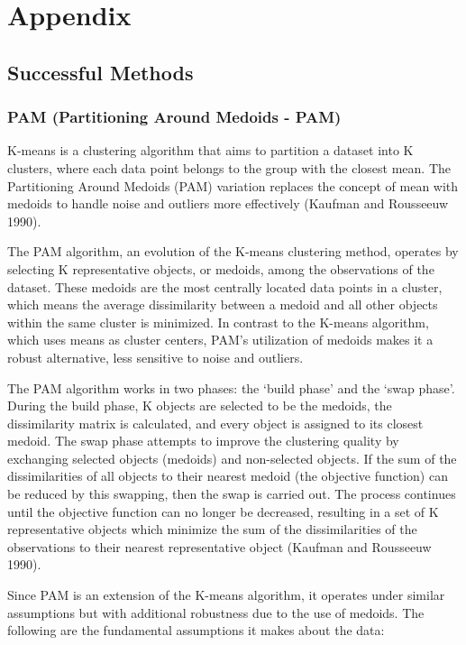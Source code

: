 \documentclass[11pt, a4paper]{article}
\newcommand{\comment}[1]{}
\begin{document}
\comment{

\renewcommand{\bibsection}{}

}






\pagebreak
\appendix
\section{Appendix}


\subsection{Successful Methods}\label{appendix:successful}


\subsubsection{PAM (Partitioning Around Medoids - PAM)}

K-means is a clustering algorithm that aims to partition a dataset into K clusters, where each data point belongs to the group with the closest mean. The Partitioning Around Medoids (PAM) variation replaces the concept of mean with medoids to handle noise and outliers more effectively (Kaufman and Rousseeuw 1990).
\par
The PAM algorithm, an evolution of the K-means clustering method, operates by selecting K representative objects, or medoids, among the observations of the dataset. These medoids are the most centrally located data points in a cluster, which means the average dissimilarity between a medoid and all other objects within the same cluster is minimized. In contrast to the K-means algorithm, which uses means as cluster centers, PAM's utilization of medoids makes it a robust alternative, less sensitive to noise and outliers.
\par
The PAM algorithm works in two phases: the `build phase' and the `swap phase'. During the build phase, K objects are selected to be the medoids, the dissimilarity matrix is calculated, and every object is assigned to its closest medoid. The swap phase attempts to improve the clustering quality by exchanging selected objects (medoids) and non-selected objects. If the sum of the dissimilarities of all objects to their nearest medoid (the objective function) can be reduced by this swapping, then the swap is carried out. The process continues until the objective function can no longer be decreased, resulting in a set of K representative objects which minimize the sum of the dissimilarities of the observations to their nearest representative object (Kaufman and Rousseeuw 1990).
\par
Since PAM is an extension of the K-means algorithm, it operates under similar assumptions but with additional robustness due to the use of medoids. The following are the fundamental assumptions it makes about the data:
\end{document}
